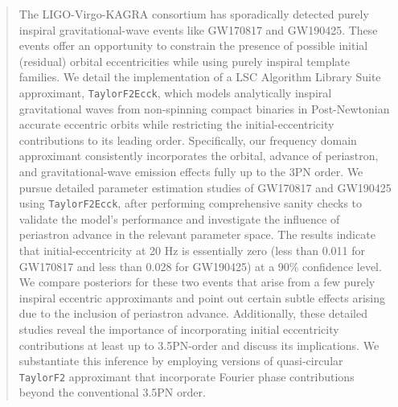 \documentclass[aps,prd,twocolumn,superscriptaddress,groupedaddress,nofootinbib,showpacs,eqsecnum,useAms]{revtex4-2}
\begin{document}
\begin{abstract}

The LIGO-Virgo-KAGRA consortium has sporadically detected purely inspiral 
gravitational-wave events like GW170817 and GW190425.
These events offer an opportunity to constrain the presence of possible initial (residual) orbital eccentricities 
while using purely inspiral template families. 
We detail the implementation of a LSC Algorithm Library Suite approximant, \texttt{TaylorF2Ecck}, which models analytically inspiral gravitational waves from non-spinning compact binaries in Post-Newtonian accurate eccentric orbits while restricting the initial-eccentricity contributions to its leading order.
Specifically, our frequency domain approximant consistently incorporates the orbital,  advance of periastron, and gravitational-wave emission effects fully up to the 3PN order.
We pursue detailed parameter estimation studies of GW170817 and GW190425 using \texttt{TaylorF2Ecck}, after performing comprehensive sanity checks to validate the model’s performance and investigate the influence of  periastron advance in the relevant parameter space.
The results indicate that initial-eccentricity at 20 Hz is essentially zero (less than 0.011 for GW170817 and less than 0.028 for GW190425) at a 90\% confidence level. 
We compare posteriors for these two events that arise from a few purely inspiral eccentric approximants and point out certain subtle effects arising due to the inclusion of periastron advance.
Additionally, these detailed studies reveal the importance of incorporating initial eccentricity contributions at least up to 3.5PN-order and discuss its implications. We substantiate this inference by employing versions of quasi-circular \texttt{TaylorF2} approximant that incorporate Fourier phase contributions beyond the conventional 3.5PN order.


\end{abstract}
\end{document}
